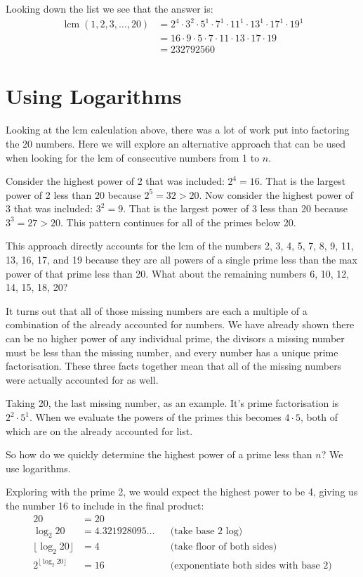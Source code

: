\documentclass{article}
\DeclareMathOperator{\lcm}{lcm}
\begin{document}
Looking down the list we see that the answer is:
\[\begin{aligned}
    \lcm(1, 2, 3, \dots, 20) &= 2^4 \cdot 3^2 \cdot 5^1 \cdot 7^1 \cdot 11^1 \cdot 13^1 \cdot 17^1 \cdot 19^1 \\
    &= 16 \cdot 9 \cdot 5 \cdot 7 \cdot 11 \cdot 13 \cdot 17 \cdot 19 \\
    &= 232792560
\end{aligned}  \]

\section*{Using Logarithms}
Looking at the lcm calculation above, there was a lot of work put into factoring the 20 numbers. Here we will explore an alternative approach that can be used when looking for the lcm of consecutive numbers from 1 to \(n\).

Consider the highest power of 2 that was included: \(2^4 = 16\). That is the largest power of 2 less than 20 because \(2^5 = 32 > 20\). Now consider the highest power of 3 that was included: \(3^2 = 9\). That is the largest power of 3 less than 20 because \(3^3 = 27 > 20\). This pattern continues for all of the primes below 20.

This approach directly accounts for the lcm of the numbers 2, 3, 4, 5, 7, 8, 9, 11, 13, 16, 17, and 19 because they are all powers of a single prime less than the max power of that prime less than 20. What about the remaining numbers 6, 10, 12, 14, 15, 18, 20?

It turns out that all of those missing numbers are each a multiple of a combination of the already accounted for numbers. We have already shown there can be no higher power of any individual prime, the divisors a missing number must be less than the missing number, and every number has a unique prime factorisation. These three facts together mean that all of the missing numbers were actually accounted for as well.

Taking 20, the last missing number, as an example. It's prime factorisation is \(2^2 \cdot 5^1\). When we evaluate the powers of the primes this becomes \(4 \cdot 5\), both of which are on the already accounted for list.

So how do we quickly determine the highest power of a prime less than \(n\)? We use logarithms.

Exploring with the prime 2, we would expect the highest power to be 4, giving us the number 16 to include in the final product:
\[\begin{aligned}
    20 &= 20 \\
    \log_2{20} &= 4.321928095\dots && \text{(take base 2 log)}\\
    \lfloor\log_2{20}\rfloor &= 4 && \text{(take floor of both sides)} \\
    2^{\lfloor\log_2{20}\rfloor} &= 16 && \text{(exponentiate both sides with base 2)}
\end{aligned}\]
\end{document}
